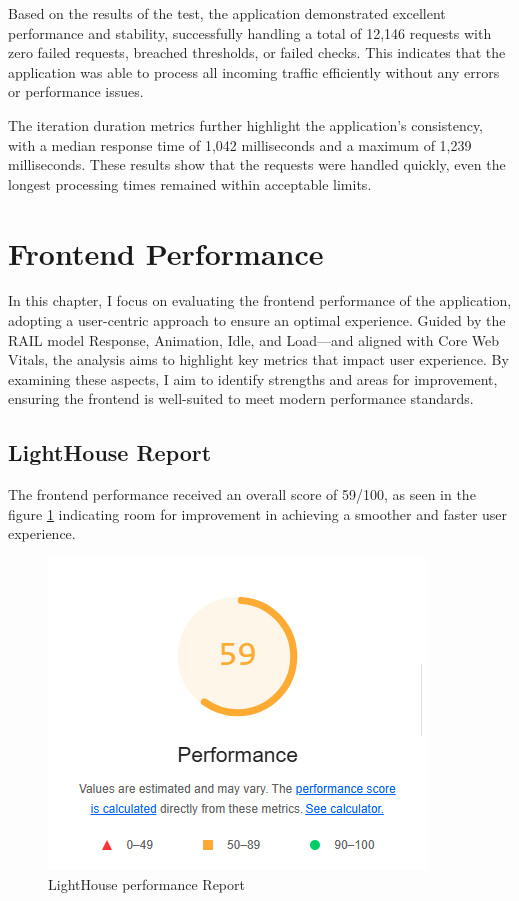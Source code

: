 \documentclass[a4paper,11pt,openright,BCOR=15mm]{scrbook}
\begin{document}
Based on the results of the test, the application demonstrated excellent performance and stability, successfully handling a total of 12,146 requests with zero failed requests, breached thresholds, or failed checks. This indicates that the application was able to process all incoming traffic efficiently without any errors or performance issues.

The iteration duration metrics further highlight the application's consistency, with a median response time of 1,042 milliseconds and a maximum of 1,239 milliseconds. These results show that the requests were handled quickly, even the longest processing times remained within acceptable limits.



\section{Frontend Performance}
In this chapter, I focus on evaluating the frontend performance of the application, adopting a user-centric approach to ensure an optimal experience. Guided by the RAIL model Response, Animation, Idle, and Load—and aligned with Core Web Vitals, the analysis aims to highlight key metrics that impact user experience. By examining these aspects, I aim to identify strengths and areas for improvement, ensuring the frontend is well-suited to meet modern performance standards.
\subsection{LightHouse Report}
The frontend performance received an overall score of 59/100, as seen in the figure \ref{fig:LightHousePerformance} indicating room for improvement in achieving a smoother and faster user experience. 

\begin{figure}[H]
	\centering
	\includegraphics[width=.7\textwidth]{figs/Performance/Frontend/Lighthouse Performance.png}
	\caption{LightHouse performance Report}
	\label{fig:LightHousePerformance}
\end{figure}
\end{document}
